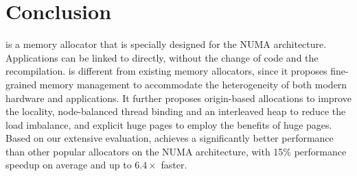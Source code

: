 \section{Conclusion}
\label{sec:conclusion}

\NM{} is a memory allocator that is specially designed for the NUMA architecture. Applications can be linked to \NM{} directly, without the change of code and the recompilation. \NM{} is different from existing memory allocators, since it proposes fine-grained memory management to accommodate the heterogeneity of both modern hardware and applications. It further proposes origin-based allocations to improve the locality, node-balanced thread binding and an interleaved heap to reduce the load imbalance, and explicit huge pages to employ the benefits of huge pages. 
Based on our extensive evaluation, \NM{} achieves a significantly better performance than other popular allocators on the NUMA architecture, with 15\% performance speedup on average and up to $6.4\times$ faster. 

